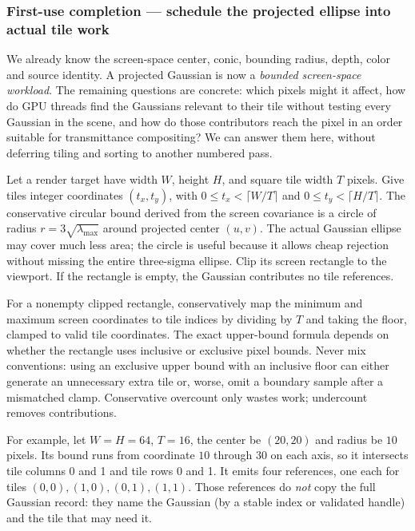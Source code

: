 \subsubsection{First-use completion --- schedule the projected ellipse into actual tile work}\label{04-visual-computing-ii-ch038-first-use-completion-schedule-the-projected-ellipse-into-actual-tile-work}

We already know the screen-space center, conic, bounding radius, depth, color and source identity. A projected Gaussian is now a \emph{bounded screen-space workload}. The remaining questions are concrete: which pixels might it affect, how do GPU threads find the Gaussians relevant to their tile without testing every Gaussian in the scene, and how do those contributors reach the pixel in an order suitable for transmittance compositing? We can answer them here, without deferring tiling and sorting to another numbered pass.

Let a render target have width \(W\), height \(H\), and square tile width \(T\) pixels. Give tiles integer coordinates \((t_x,t_y)\), with \(0\le t_x<\lceil W/T\rceil\) and \(0\le t_y<\lceil H/T\rceil\). The conservative circular bound derived from the screen covariance is a circle of radius \(r=3\sqrt{\lambda_{\max}}\) around projected center \((u,v)\). The actual Gaussian ellipse may cover much less area; the circle is useful because it allows cheap rejection without missing the entire three-sigma ellipse. Clip its screen rectangle to the viewport. If the rectangle is empty, the Gaussian contributes no tile references.

For a nonempty clipped rectangle, conservatively map the minimum and maximum screen coordinates to tile indices by dividing by \(T\) and taking the floor, clamped to valid tile coordinates. The exact upper-bound formula depends on whether the rectangle uses inclusive or exclusive pixel bounds. Never mix conventions: using an exclusive upper bound with an inclusive floor can either generate an unnecessary extra tile or, worse, omit a boundary sample after a mismatched clamp. Conservative overcount only wastes work; undercount removes contributions.

For example, let \(W=H=64\), \(T=16\), the center be \((20,20)\) and radius be \(10\) pixels. Its bound runs from coordinate \(10\) through \(30\) on each axis, so it intersects tile columns 0 and 1 and tile rows 0 and 1. It emits four references, one each for tiles \((0,0),(1,0),(0,1),(1,1)\). Those references do \emph{not} copy the full Gaussian record: they name the Gaussian (by a stable index or validated handle) and the tile that may need it.

